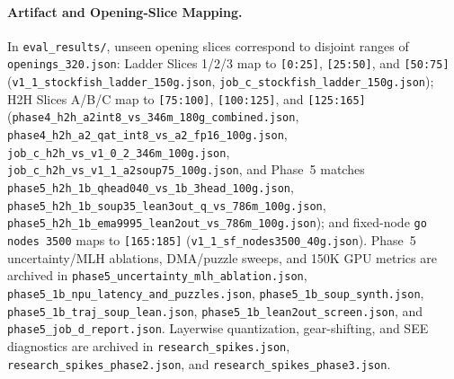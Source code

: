 \documentclass[10pt,twocolumn]{article}
\begin{document}
\paragraph{Artifact and Opening-Slice Mapping.}
In \texttt{eval\_results/}, unseen opening slices correspond to disjoint ranges of \texttt{openings\_\allowbreak 320.json}: Ladder Slices 1/2/3 map to \texttt{[0:25]}, \texttt{[25:50]}, and \texttt{[50:75]} (\texttt{v1\_1\_\allowbreak stockfish\_\allowbreak ladder\_\allowbreak 150g.json}, \texttt{job\_c\_\allowbreak stockfish\_\allowbreak ladder\_\allowbreak 150g.json}); H2H Slices A/B/C map to \texttt{[75:100]}, \texttt{[100:125]}, and \texttt{[125:165]} (\texttt{phase4\_h2h\_\allowbreak a2int8\_\allowbreak vs\_346m\_\allowbreak 180g\_combined.json}, \texttt{phase4\_h2h\_\allowbreak a2\_qat\_\allowbreak int8\_vs\_\allowbreak a2\_fp16\_100g.json}, \texttt{job\_c\_h2h\_\allowbreak vs\_v1\_0\_2\_\allowbreak 346m\_100g.json}, \texttt{job\_c\_h2h\_\allowbreak vs\_v1\_1\_\allowbreak a2soup75\_100g.json}, and Phase~5 matches \texttt{phase5\_h2h\_\allowbreak 1b\_\allowbreak qhead040\_\allowbreak vs\_1b\_3head\_\allowbreak 100g.json}, \texttt{phase5\_h2h\_\allowbreak 1b\_\allowbreak soup35\_\allowbreak lean3out\_q\_\allowbreak vs\_786m\_\allowbreak 100g.json}, \texttt{phase5\_h2h\_\allowbreak 1b\_\allowbreak ema9995\_\allowbreak lean2out\_\allowbreak vs\_786m\_\allowbreak 100g.json}); and fixed-node \texttt{go nodes 3500} maps to \texttt{[165:185]} (\texttt{v1\_1\_sf\_\allowbreak nodes3500\_40g.json}). Phase~5 uncertainty/MLH ablations, DMA/puzzle sweeps, and 150K GPU metrics are archived in \texttt{phase5\_\allowbreak uncertainty\_\allowbreak mlh\_\allowbreak ablation.json}, \texttt{phase5\_\allowbreak 1b\_\allowbreak npu\_\allowbreak latency\_\allowbreak and\_\allowbreak puzzles.json}, \texttt{phase5\_\allowbreak 1b\_\allowbreak soup\_\allowbreak synth.json}, \texttt{phase5\_\allowbreak 1b\_\allowbreak traj\_\allowbreak soup\_\allowbreak lean.json}, \texttt{phase5\_\allowbreak 1b\_\allowbreak lean2out\_\allowbreak screen.json}, and \texttt{phase5\_\allowbreak job\_d\_\allowbreak report.json}. Layerwise quantization, gear-shifting, and SEE diagnostics are archived in \texttt{research\_\allowbreak spikes.json}, \texttt{research\_\allowbreak spikes\_\allowbreak phase2.json}, and \texttt{research\_\allowbreak spikes\_\allowbreak phase3.json}.
\end{document}
